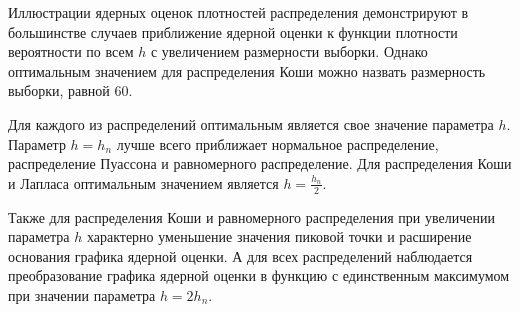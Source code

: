 \documentclass[12pt,a4paper]{article}
\begin{document}
Иллюстрации ядерных оценок плотностей распределения демонстрируют в большинстве случаев приближение ядерной оценки к функции плотности вероятности по всем $h$ с увеличением размерности выборки. Однако оптимальным значением для распределения Коши можно назвать размерность выборки, равной 60.

Для каждого из распределений оптимальным является свое значение параметра $h$. Параметр $h=h_n$ лучше всего приближает нормальное распределение, распределение Пуассона и равномерного распределение. Для распределения Коши и Лапласа оптимальным значением является $h=\frac{h_n}{2}$.

Также для распределения Коши и равномерного распределения при увеличении параметра $h$ характерно уменьшение значения пиковой точки и расширение основания графика ядерной оценки. А для всех распределений наблюдается преобразование графика ядерной оценки в функцию с единственным максимумом при значении параметра $h=2h_n$.
\end{document}
